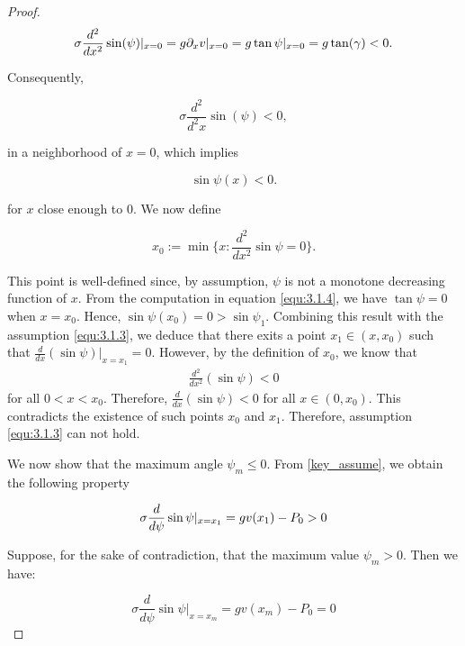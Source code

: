 \documentclass[10pt,a4paper]{amsart}
\begin{document}
\begin{proof}
    \begin{equation}{\label{equ:3.1.4}}
        \sigma \frac{d^{2}}{dx^{2}}\sin(\psi)|_{x=0}=g\partial_{x}v|_{x=0}=g \tan\psi|_{x=0}=g \tan (\gamma)< 0.
    \end{equation}

    \noindent Consequently,

    \begin{equation*}
        \sigma \frac{d^{2}}{d^{2}x}\sin(\psi)<0,
    \end{equation*}

    \noindent in a neighborhood of $x=0$, which implies

    \begin{equation*}
        \sin\psi(x)<0.
    \end{equation*}
    
    \noindent for $x$ close enough to $0$. We now define

    \begin{equation*}
        x_{0}:=\min\{x:\frac{d^{2}}{dx^{2}}\sin\psi=0\}.
    \end{equation*}

    \noindent This point is well-defined since, by assumption, $\psi$ is not a monotone decreasing function of $x$. From the computation in equation \eqref{equ:3.1.4}, we have $\tan\psi=0$ when $x=x_0$. Hence, $\sin\psi(x_0)=0>\sin\psi_1$. Combining this result with the assumption \eqref{equ:3.1.3}, we deduce that there exits a point $x_{1}\in(x,x_{0})$ such that $\frac{d}{dx}(\sin\psi)|_{x=x_{1}}=0$. However, by the definition of $x_{0}$, we know that 
    \begin{align}
        \frac{d^{2}}{dx^{2}}(\sin\psi)<0
    \end{align}
    for all $0<x<x_0$. Therefore, $\frac{d}{dx}(\sin\psi)<0$ for all $x\in(0,x_0)$. This  contradicts the existence of such points $x_0$ and $x_{1}$. Therefore, assumption \eqref{equ:3.1.3} can not hold.
    
    We now show that the maximum angle $\psi_{m}\leq0$. From \eqref{key_assume}, we obtain the following property

    \begin{equation}{\label{equ:3.1.5}}
        \sigma \frac{d}{d\psi}\sin\psi|_{x=x_{1}}=gv(x_{1})-P_{0}>0
    \end{equation}

    \noindent Suppose, for the sake of contradiction, that the maximum value $\psi_m>0$. Then we have:

    \begin{equation*}
        \sigma \frac{d}{d\psi}\sin\psi|_{x=x_m}=gv(x_m)-P_{0}=0
    \end{equation*}


\end{proof}
\end{document}
